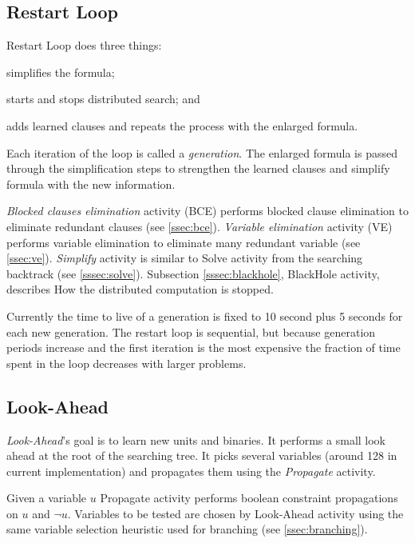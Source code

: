 \subsection{Restart Loop}

Restart Loop does three things:
\begin{inparaenum}[a)]
  \item simplifies the formula;
  \item starts and stops distributed search; and
  \item adds learned clauses and repeats the process with the enlarged formula.
\end{inparaenum} Each iteration of the loop is called a
\emph{generation}. The enlarged formula is passed through the
simplification steps to strengthen the learned clauses and simplify
formula with the new information.

\emph{Blocked clauses elimination} activity (BCE) performs
blocked clause elimination to eliminate redundant clauses (see
\ref{ssec:bce}). \emph{Variable elimination} activity (VE) performs
variable elimination to eliminate many redundant variable (see
\ref{ssec:ve}). \emph{Simplify} activity is similar to Solve
activity from the searching backtrack (see \ref{sssec:solve}).
Subsection \ref{sssec:blackhole}, BlackHole activity, describes
How the distributed computation is stopped.

Currently the time to live of a generation is fixed to 10 second
plus 5 seconds for each new generation.  The restart loop is sequential, but because generation
periods increase and the first iteration is the most expensive the
fraction of time spent in the loop decreases with larger problems.


\subsection{Look-Ahead}

\emph{Look-Ahead}'s goal is to learn new units and binaries.
It performs a small look ahead at the root of the searching tree. It
picks several variables (around 128 in current implementation)
and propagates them using the \emph{Propagate} activity.

Given a variable $u$ Propagate activity performs boolean constraint
propagations on $u$ and $\neg u$. Variables to be tested are chosen
by Look-Ahead activity using the same variable selection heuristic
used for branching (see \ref{ssec:branching}).

